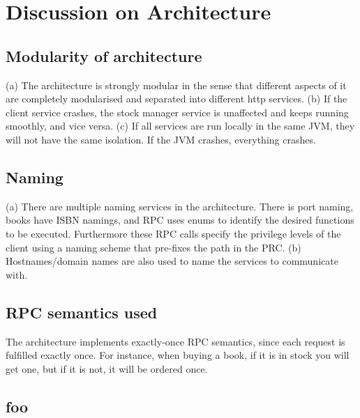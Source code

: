 \chapter{Discussion on Architecture}

\section{Modularity of architecture}
(a) The architecture is strongly modular in the sense that different aspects of it are completely modularised and separated into different http services. (b) If the client service crashes, the stock manager service is unaffected and keeps running smoothly, and vice versa. (c) If all services are run locally in the same JVM, they will not have the same isolation. If the JVM crashes, everything crashes.

\section{Naming}
(a) There are multiple naming services in the architecture. There is port naming, books have ISBN namings, and RPC uses enums to identify the desired functions to be executed. Furthermore these RPC calls specify the privilege levels of the client using a naming scheme that pre-fixes the path in the PRC. (b) Hostnames/domain names are also used to name the services to communicate with.

\section{RPC semantics used}
The architecture implements exactly-once RPC semantics, since each request is fulfilled exactly once. For instance, when buying a book, if it is in stock you will get one, but if it is not, it will be ordered once.

\section{foo}

